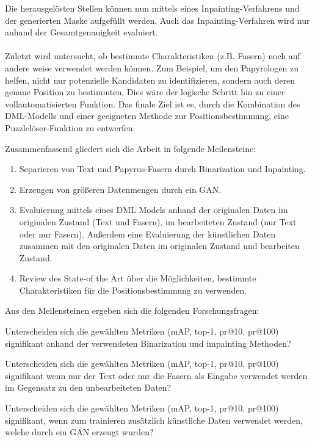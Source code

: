 \documentclass[12pt,a4paper]{article}
\begin{document}
Die herausgelösten Stellen können nun mittels eines Inpainting-Verfahrens und der generierten Maske aufgefüllt werden. Auch das Inpainting-Verfahren wird nur anhand der Gesamtgenauigkeit evaluiert.
\\\\
Zuletzt wird untersucht, ob bestimmte Charakteristiken (z.B. Fasern) noch auf andere weise %
verwendet werden können. Zum Beispiel, um den Papyrologen zu helfen, nicht nur potenzielle Kandidaten zu identifizieren, sondern auch deren genaue Position zu bestimmten. %
Dies wäre der logische Schritt hin zu einer vollautomatisierten Funktion. Das finale Ziel %
ist es, durch die Kombination des DML-Modells und einer geeigneten Methode zur Positionsbestimmung, eine Puzzlelöser-Funktion zu entwerfen.


Zusammenfassend gliedert sich die Arbeit in folgende Meilensteine:


\begin{enumerate}
	\item Separieren von Text und Papyrus-Fasern durch Binarization und Inpainting.
	
	\item Erzeugen von größeren Datenmengen durch ein GAN.
	
	\item Evaluierung mittels eines DML Models anhand der originalen Daten im originalen Zustand (Text und Fasern), im bearbeiteten Zustand (nur Text oder nur Fasern). Außerdem eine Evaluierung der künstlichen Daten zusammen mit den originalen Daten im originalen Zustand und bearbeiten Zustand.
	
	\item Review des State-of the Art über die Möglichkeiten, bestimmte Charakteristiken für die Positionsbestimmung zu verwenden. 
	    	      	      	      	      	      	      
\end{enumerate}
		
Aus den Meilensteinen ergeben sich die folgenden Forschungsfragen:

\begin{questions}
	\item Unterscheiden sich die gewählten Metriken (mAP, top-1, pr@10, pr@100) signifikant anhand der verwendeten Binarization und impainting Methoden?
	
	\item  Unterscheiden sich die gewählten Metriken (mAP, top-1, pr@10, pr@100) signifikant wenn nur der Text oder nur die Fasern als Eingabe verwendet werden im Gegensatz zu den unbearbeiteten Daten?  
	\item  Unterscheiden sich die gewählten Metriken (mAP, top-1, pr@10, pr@100) signifikant, wenn zum trainieren zusätzlich künstliche Daten verwendet werden, welche durch ein GAN erzeugt wurden?
\end{questions}
\end{document}
